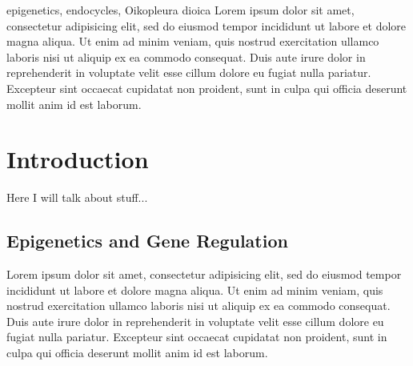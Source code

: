 \documentclass[11pt,twoside,a4paper]{report}
\begin{document}
\cleardoublepage


\TitlePage
    \vspace*{55mm}
        {epigenetics, endocycles, Oikopleura dioica}
		{Lorem ipsum dolor sit amet, consectetur adipisicing elit, sed do eiusmod tempor incididunt ut labore et dolore magna aliqua. Ut enim ad minim veniam, quis nostrud exercitation ullamco laboris nisi ut aliquip ex ea commodo consequat. Duis aute irure dolor in reprehenderit in voluptate velit esse cillum dolore eu fugiat nulla pariatur. Excepteur sint occaecat cupidatat non proident, sunt in culpa qui officia deserunt mollit anim id est laborum.}
\EndTitlePage

\cleardoublepage



\tableofcontents
\cleardoublepage

\listoffigures
\cleardoublepage

\listoftables
\cleardoublepage

\chapter{Introduction}
Here I will talk about stuff...
\cite{Roy2010}
\cite{DeVeylder2011}

	\section{Epigenetics and Gene Regulation}
	Lorem ipsum dolor sit amet, consectetur adipisicing elit, sed do eiusmod tempor incididunt ut labore et dolore magna aliqua. Ut enim ad minim veniam, quis nostrud exercitation ullamco laboris nisi ut aliquip ex ea commodo consequat. Duis aute irure dolor in reprehenderit in voluptate velit esse cillum dolore eu fugiat nulla pariatur. Excepteur sint occaecat cupidatat non proident, sunt in culpa qui officia deserunt mollit anim id est laborum.
\end{document}
